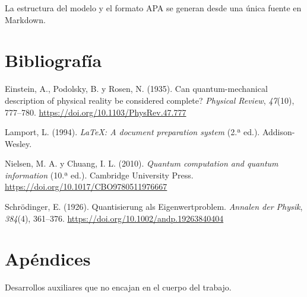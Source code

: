 \documentclass[11pt,a4paper,spanish]{book}
\newlength{\cslhangindent}
\newenvironment{CSLReferences}[2]
 {\begin{list}{}{%
  \setlength{\itemindent}{0pt}
  \setlength{\leftmargin}{0pt}
  \setlength{\parsep}{0pt}
  \ifodd #1
   \setlength{\leftmargin}{\cslhangindent}
   \setlength{\itemindent}{-1\cslhangindent}
  \fi
  \setlength{\itemsep}{#2\baselineskip}}%
  \raggedright
  \renewcommand{\bibitem}[2][]{\item}}
 {\end{list}}
\begin{document}
La estructura del modelo y el formato APA se generan desde una única
fuente en Markdown.

\chapter*{Bibliografía}\label{bibliografuxeda}

\protect{}\label{refs}
\begin{CSLReferences}{1}{0}
\bibitem[\citeproctext]{ref-epr1935}
Einstein, A., Podolsky, B. y Rosen, N. (1935). Can quantum-mechanical
description of physical reality be considered complete? \emph{Physical
Review}, \emph{47}(10), 777--780.
\url{https://doi.org/10.1103/PhysRev.47.777}

\bibitem[\citeproctext]{ref-lamport1994}
Lamport, L. (1994). \emph{{LaTeX}: A document preparation system} (2.ª
ed.). Addison-Wesley.

\bibitem[\citeproctext]{ref-nielsen2010}
Nielsen, M. A. y Chuang, I. L. (2010). \emph{Quantum computation and
quantum information} (10.ª ed.). Cambridge University Press.
\url{https://doi.org/10.1017/CBO9780511976667}

\bibitem[\citeproctext]{ref-schrodinger1926}
Schrödinger, E. (1926). Quantisierung als Eigenwertproblem.
\emph{Annalen der Physik}, \emph{384}(4), 361--376.
\url{https://doi.org/10.1002/andp.19263840404}

\end{CSLReferences}

\appendix

\chapter{Apéndices}\label{apuxe9ndices}

Desarrollos auxiliares que no encajan en el cuerpo del trabajo.
\end{document}
